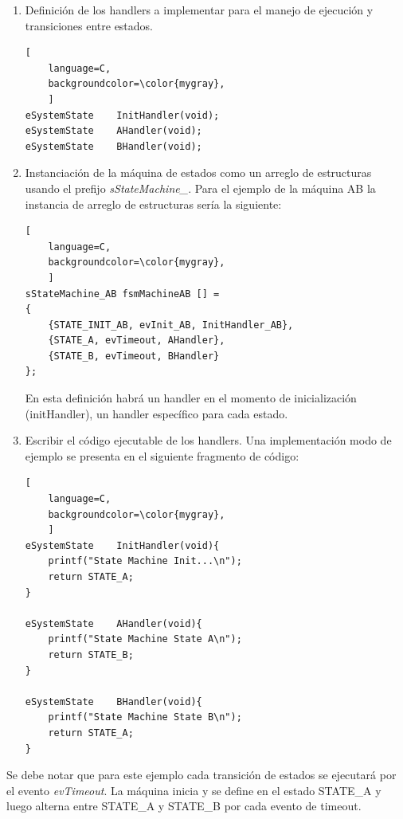 \begin{enumerate}
\begin{lstlisting}[
	language=C, 
	backgroundcolor=\color{mygray},
	]
typedef struct{

	eSystemState  	fsmState;
	eSystemEvent  	fsmEvent;
	pfEventHandler	fsmHandler;

} sStateMachine;
\end{lstlisting}

\item Definición de los handlers a implementar para el manejo de ejecución y transiciones entre estados.

\begin{lstlisting}[
	language=C, 
	backgroundcolor=\color{mygray},
	]
eSystemState 	InitHandler(void);
eSystemState 	AHandler(void);
eSystemState 	BHandler(void);
\end{lstlisting}

\item Instanciación de la máquina de estados como un arreglo de estructuras usando el prefijo \textit{sStateMachine\_}. Para el ejemplo de la máquina AB la instancia de arreglo de estructuras sería la siguiente:

\begin{lstlisting}[
	language=C, 
	backgroundcolor=\color{mygray},
	]
sStateMachine_AB fsmMachineAB [] = 
{
	{STATE_INIT_AB, evInit_AB, InitHandler_AB},
	{STATE_A, evTimeout, AHandler},
	{STATE_B, evTimeout, BHandler}
};
\end{lstlisting}

En esta definición habrá un handler en el momento de inicialización (initHandler), un handler específico para cada estado.

\item Escribir el código ejecutable de los handlers. Una implementación  modo de ejemplo se presenta en el siguiente fragmento de código:

\begin{lstlisting}[
	language=C, 
	backgroundcolor=\color{mygray},
	]
eSystemState 	InitHandler(void){ 
	printf("State Machine Init...\n");
	return STATE_A; 
}

eSystemState 	AHandler(void){ 
	printf("State Machine State A\n");
	return STATE_B; 
}

eSystemState 	BHandler(void){ 
	printf("State Machine State B\n");
	return STATE_A; 
}
\end{lstlisting}
\end{enumerate}


Se debe notar que para este ejemplo cada transición de estados se ejecutará por el evento \textit{evTimeout}. La máquina inicia y se define en el estado STATE\_A y luego alterna entre STATE\_A y STATE\_B por cada evento de timeout.

